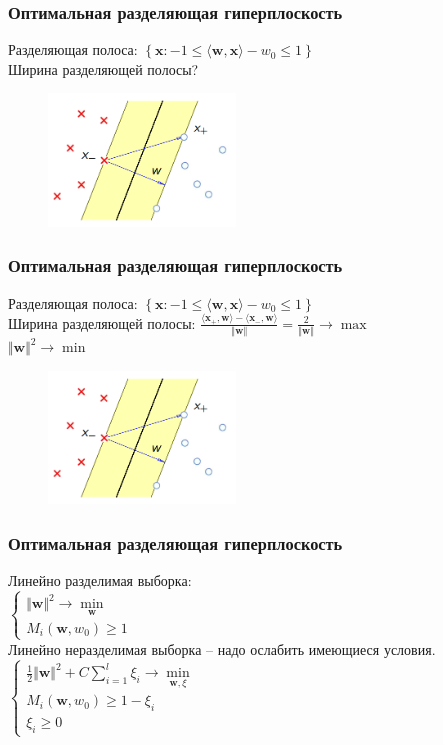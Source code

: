 \documentclass[12pt]{beamer}
\begin{document}
\begin{frame}\frametitle{Оптимальная разделяющая гиперплоскость}
Разделяющая полоса: $\left\{\mathbf{x}: -1 \leq \langle \mathbf{w}, \mathbf{x}\rangle - w_0 \leq 1\right\}$\\
Ширина разделяющей полосы?
\begin{figure}[htbp]
  \includegraphics[height=100pt, keepaspectratio = true]{images/linearly_separable}   
\end{figure}
\end{frame}

\begin{frame}\frametitle{Оптимальная разделяющая гиперплоскость}
Разделяющая полоса: $\left\{\mathbf{x}: -1 \leq \langle \mathbf{w}, \mathbf{x}\rangle - w_0 \leq 1\right\}$\\
Ширина разделяющей полосы: $\frac{\langle \mathbf{x_{+}}, \mathbf{w} \rangle - \langle \mathbf{x_{-}}, \mathbf{w} \rangle}{\Vert \mathbf{w} \Vert} = \frac{2}{\Vert \mathbf{w} \Vert} \rightarrow \max$\\
${\Vert \mathbf{w} \Vert^2 \rightarrow \min}$
\begin{figure}[htbp]
  \includegraphics[height=100pt, keepaspectratio = true]{images/linearly_separable}   
\end{figure}
\end{frame}

\begin{frame}\frametitle{Оптимальная разделяющая гиперплоскость}
Линейно разделимая выборка:\\
$\begin{cases}
{\Vert \mathbf{w} \Vert^2 \rightarrow \min\limits_{\mathbf{w}}}\\
M_i(\mathbf{w}, w_0) \geq 1
\end{cases}$\\
Линейно неразделимая выборка -- надо ослабить имеющиеся условия.\\
$\begin{cases}
{\frac{1}{2}\Vert \mathbf{w} \Vert^2 + C \sum\limits_{i=1}^l \xi_i \rightarrow \min\limits_{\mathbf{w}, \xi}}\\
M_i(\mathbf{w}, w_0) \geq 1 - \xi_i\\
\xi_i \geq 0
\end{cases}$\\
\end{frame}
\end{document}

